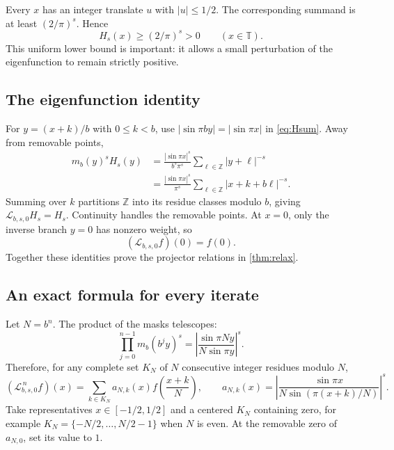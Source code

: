 \documentclass[11pt,a4paper]{article}
\numberwithin{equation}{section}
\theoremstyle{definition}
\theoremstyle{remark}
\newcommand{\TT}{\mathbb T}
\newcommand{\ZZ}{\mathbb Z}
\newcommand{\Lop}{\mathcal L}
\begin{document}
Every $x$ has an integer translate $u$ with $|u|\le1/2$. The corresponding
summand is at least $(2/\pi)^s$. Hence
\begin{equation}
 H_s(x)\ge(2/\pi)^s>0\qquad(x\in\TT).
 \label{eq:Hpositive}
\end{equation}
This uniform lower bound is important: it allows a small perturbation of
the eigenfunction to remain strictly positive.

\subsection{The eigenfunction identity}
For $y=(x+k)/b$ with $0\le k<b$, use
$|\sin\pi by|=|\sin\pi x|$ in \cref{eq:Hsum}. Away from removable
points,
\begin{align*}
 m_b(y)^sH_s(y)
 &=\frac{|\sin\pi x|^s}{b^s\pi^s}
   \sum_{\ell\in\ZZ}|y+\ell|^{-s}\\
 &=\frac{|\sin\pi x|^s}{\pi^s}
   \sum_{\ell\in\ZZ}|x+k+b\ell|^{-s}.
\end{align*}
Summing over $k$ partitions $\ZZ$ into its residue classes modulo $b$,
giving $\Lop_{b,s,0}H_s=H_s$. Continuity handles the removable points.
At $x=0$, only the inverse branch $y=0$ has nonzero weight, so
\begin{equation}
 (\Lop_{b,s,0}f)(0)=f(0).
 \label{eq:delta-left}
\end{equation}
Together these identities prove the projector relations in
\cref{thm:relax}.

\subsection{An exact formula for every iterate}
Let $N=b^n$. The product of the masks telescopes:
\begin{equation}
 \prod_{j=0}^{n-1}m_b(b^jy)^s
 =\left|\frac{\sin\pi Ny}{N\sin\pi y}\right|^s.
 \label{eq:telescope}
\end{equation}
Therefore, for any complete set $K_N$ of $N$ consecutive integer residues
modulo $N$,
\begin{equation}
 (\Lop_{b,s,0}^{\,n}f)(x)
 =\sum_{k\in K_N}a_{N,k}(x)f\left(\frac{x+k}{N}\right),\qquad
 a_{N,k}(x)=\left|
 \frac{\sin\pi x}{N\sin(\pi(x+k)/N)}\right|^s.
 \label{eq:iterate}
\end{equation}
Take representatives $x\in[-1/2,1/2]$ and a centered $K_N$ containing
zero, for example $K_N=\{-N/2,\ldots,N/2-1\}$ when $N$ is even.
At the removable zero of $a_{N,0}$, set its value to $1$.
\end{document}
